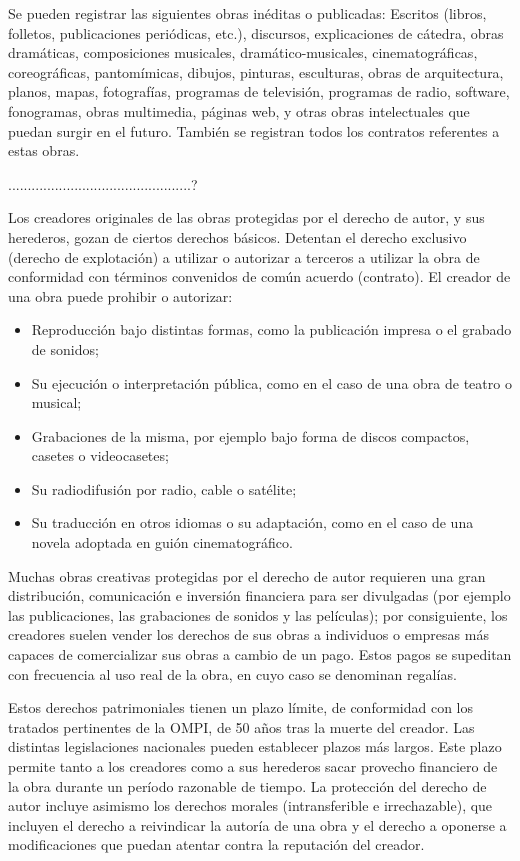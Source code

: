 Se pueden registrar las siguientes obras inéditas o publicadas: Escritos (libros, folletos, publicaciones periódicas, etc.), discursos, explicaciones de cátedra, obras dramáticas, composiciones musicales, dramático-musicales, cinematográficas, coreográficas, pantomímicas, dibujos, pinturas, esculturas, obras de arquitectura, planos, mapas, fotografías, programas de televisión, programas de radio, software, fonogramas, obras multimedia, páginas web, y otras obras intelectuales que puedan surgir en el futuro. También se registran todos los contratos referentes a estas obras.

...............................................?



Los creadores originales de las obras protegidas por el derecho de autor, y sus herederos, gozan de ciertos derechos básicos. Detentan el derecho exclusivo (derecho de explotación) a utilizar o autorizar a terceros a utilizar la obra de conformidad con términos convenidos de común acuerdo (contrato). El creador de una obra puede prohibir o autorizar:

\begin{itemize}
  \item Reproducción bajo distintas formas, como la publicación impresa o el grabado de sonidos;
  \item Su ejecución o interpretación pública, como en el caso de una obra de teatro o musical;
  \item Grabaciones de la misma, por ejemplo bajo forma de discos compactos, casetes o videocasetes;
  \item Su radiodifusión por radio, cable o satélite;
  \item Su traducción en otros idiomas o su adaptación, como en el caso de una novela adoptada en guión cinematográfico.
\end{itemize}
Muchas obras creativas protegidas por el derecho de autor requieren una gran distribución, comunicación e inversión financiera para ser divulgadas (por ejemplo las publicaciones, las grabaciones de sonidos y las películas); por consiguiente, los creadores suelen vender los derechos de sus obras a individuos o empresas más capaces de comercializar sus obras a cambio de un pago. Estos pagos se supeditan con frecuencia al uso real de la obra, en cuyo caso se denominan regalías.

Estos derechos patrimoniales tienen un plazo límite, de conformidad con los tratados pertinentes de la OMPI, de 50 años tras la muerte del creador. Las distintas legislaciones nacionales pueden establecer plazos más largos. Este plazo permite tanto a los creadores como a sus herederos sacar provecho financiero de la obra durante un período razonable de tiempo. La protección del derecho de autor incluye asimismo los derechos morales (intransferible e irrechazable), que incluyen el derecho a reivindicar la autoría de una obra y el derecho a oponerse a modificaciones que puedan atentar contra la reputación del creador.

